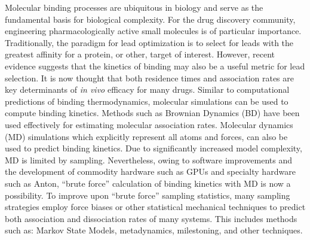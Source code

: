 \par Molecular binding processes are ubiquitous in biology and serve as the
fundamental basis for biological complexity.
For the drug discovery community, engineering pharmacologically active small molecules is of
particular importance. Traditionally, the paradigm for lead optimization is to
select for leads with the greatest affinity for a protein, or other, target of
interest. However, recent evidence suggests that the kinetics of binding may
also be a useful metric for lead selection. It is now thought that both residence
times and association rates are key determinants of \textit{in vivo} efficacy
for many drugs\cite{Schuetz2017,Lu2010a,Copeland2006b,Copeland2016,Swinney2004b}.
Similar to computational predictions of binding thermodynamics, molecular
simulations can be used to compute binding kinetics\cite{DeVivo2016,Amaro2018,Bruce2018a}. Methods such as Brownian
Dynamics (BD) have been used effectively for estimating molecular
association rates\cite{Northrup1984,McCammon1986,Zhou1990,Huber2010}.
Molecular dynamics (MD) simulations
which explicitly represent all atoms and forces, can also be used to predict
binding kinetics. Due to significantly increased model complexity, MD is
limited by sampling. Nevertheless, owing to software improvements and the
development of commodity hardware such as GPUs and specialty hardware such as
Anton\cite{Shaw2009,Shaw2014}, ``brute force'' calculation of binding kinetics with MD is now
a possibility\cite{Shan2011,Shan2012,Dror2011,Pan2013a,Tang2017}. To improve
upon ``brute force'' sampling statistics, many sampling strategies
employ force biases or other statistical mechanical techniques to predict
both association and dissociation rates of many systems. This includes methods
such as: Markov State Models\cite{Buch2011b,Plattner2015a,Wu2016,Doerr2014},
metadynamics\cite{Mollica2016a,Tiwary2015,Casasnovas2017},
milestoning\cite{Elber2017,Ma2017,Kirmizialtin2012,Yu2015,Bucci2016,Ma2015,Ma2017},
and other techniques\cite{Teo2016,Dickson2016,Dickson2017,Lotz2018a,Chiu2016,Wong2018,Tran2018}.

